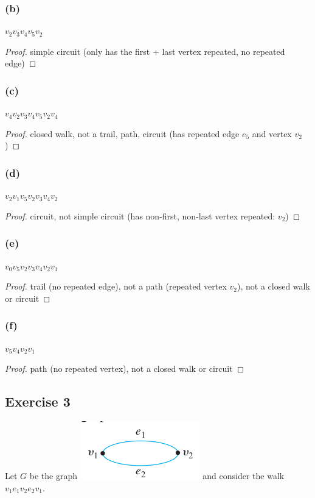 \documentclass[14pt]{extarticle}
\begin{document}
\subsubsection{(b)}
\(v_2v_3v_4v_5v_2\)
\begin{proof}
    simple circuit (only has the first + last vertex repeated, no repeated edge)
\end{proof}

\subsubsection{(c)}
\(v_4v_2v_3v_4v_5v_2v_4\)
\begin{proof}
    closed walk, not a trail, path, circuit (has repeated edge \(e_5\) and vertex \(v_2\))
\end{proof}

\subsubsection{(d)}
\(v_2v_1v_5v_2v_3v_4v_2\)
\begin{proof}
    circuit, not simple circuit (has non-first, non-last vertex repeated: \(v_2\))
\end{proof}

\subsubsection{(e)}
\(v_0v_5v_2v_3v_4v_2v_1\)
\begin{proof}
    trail (no repeated edge), not a path (repeated vertex \(v_2\)), not a closed walk or circuit
\end{proof}

\subsubsection{(f)}
\(v_5v_4v_2v_1\)

\begin{proof}
    path (no repeated vertex), not a closed walk or circuit
\end{proof}

\subsection{Exercise 3}
Let \(G\) be the graph \includegraphics[scale=0.6]{../images/10.1.3.png} and consider the walk \(v_1e_1v_2e_2v_1\).
\end{document}
